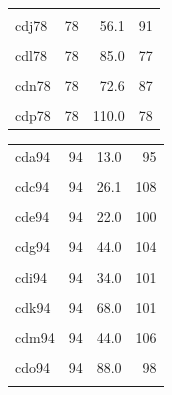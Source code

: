 \documentclass[draft,linenumbers]{agujournal2018} %
\providecommand{\DIFaddend}{} %
\DeclareRobustCommand{\DIFaddend}{\DIFOaddend \let\includegraphics\DIFOincludegraphics} %
\begin{document}
\begin{landscape}
\begin{table}
\begin{tabular}[t]{lrrr}
\cellcolor{gray!6}{cdi78} & \cellcolor{gray!6}{78} & \cellcolor{gray!6}{34.0} & \cellcolor{gray!6}{97}\\
cdj78 & 78 & 56.1 & 91\\
\addlinespace
\cellcolor{gray!6}{cdk78} & \cellcolor{gray!6}{78} & \cellcolor{gray!6}{68.0} & \cellcolor{gray!6}{84}\\
cdl78 & 78 & 85.0 & 77\\
\cellcolor{gray!6}{cdm78} & \cellcolor{gray!6}{78} & \cellcolor{gray!6}{44.0} & \cellcolor{gray!6}{78}\\
cdn78 & 78 & 72.6 & 87\\
\cellcolor{gray!6}{cdo78} & \cellcolor{gray!6}{78} & \cellcolor{gray!6}{88.0} & \cellcolor{gray!6}{85}\\
\addlinespace
cdp78 & 78 & 110.0 & 78\\
\bottomrule
\end{tabular}
\centering
\begin{tabular}[t]{lrrr}
\toprule
\cellcolor{gray!6}{Model} & \cellcolor{gray!6}{$z_{1100}$} & \cellcolor{gray!6}{$\Phi$} & \cellcolor{gray!6}{$z_c$}\\
\midrule
cda94 & 94 & 13.0 & 95\\
\cellcolor{gray!6}{cdb94} & \cellcolor{gray!6}{94} & \cellcolor{gray!6}{21.5} & \cellcolor{gray!6}{101}\\
cdc94 & 94 & 26.1 & 108\\
\cellcolor{gray!6}{cdd94} & \cellcolor{gray!6}{94} & \cellcolor{gray!6}{32.6} & \cellcolor{gray!6}{113}\\
cde94 & 94 & 22.0 & 100\\
\addlinespace
\cellcolor{gray!6}{cdf94} & \cellcolor{gray!6}{94} & \cellcolor{gray!6}{36.3} & \cellcolor{gray!6}{104}\\
cdg94 & 94 & 44.0 & 104\\
\cellcolor{gray!6}{cdh94} & \cellcolor{gray!6}{94} & \cellcolor{gray!6}{55.0} & \cellcolor{gray!6}{104}\\
cdi94 & 94 & 34.0 & 101\\
\cellcolor{gray!6}{cdj94} & \cellcolor{gray!6}{94} & \cellcolor{gray!6}{56.1} & \cellcolor{gray!6}{102}\\
\addlinespace
cdk94 & 94 & 68.0 & 101\\
\cellcolor{gray!6}{cdl94} & \cellcolor{gray!6}{94} & \cellcolor{gray!6}{85.0} & \cellcolor{gray!6}{107}\\
cdm94 & 94 & 44.0 & 106\\
\cellcolor{gray!6}{cdn94} & \cellcolor{gray!6}{94} & \cellcolor{gray!6}{72.6} & \cellcolor{gray!6}{102}\\
cdo94 & 94 & 88.0 & 98\\
\addlinespace
\cellcolor{gray!6}{cdp94} & \cellcolor{gray!6}{94} & \cellcolor{gray!6}{110.0} & \cellcolor{gray!6}{108}\\
\bottomrule
\end{tabular}
\end{table}
\end{landscape}
\DIFaddend
\end{document}

